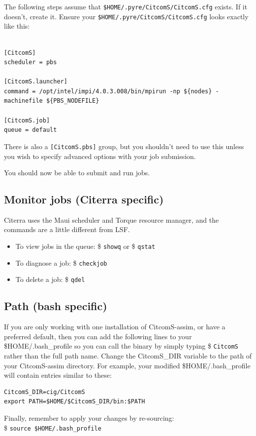 \documentclass[letterpaper,12pt]{article}
\newcommand{\tm}[1]{\$ \texttt{#1}}
\begin{document}
The following steps assume that \verb#$HOME/.pyre/CitcomS/CitcomS.cfg# exists.  If it doesn't, create it.
Ensure your \verb#$HOME/.pyre/CitcomS/CitcomS.cfg# looks exactly like this:

\begin{verbatim}

[CitcomS]
scheduler = pbs

[CitcomS.launcher]
command = /opt/intel/impi/4.0.3.008/bin/mpirun -np ${nodes} -machinefile ${PBS_NODEFILE}

[CitcomS.job]
queue = default
\end{verbatim}
There is also a \verb#[CitcomS.pbs]# group, but you shouldn't need to use this unless you wish to specify advanced options with your job submission.

You should now be able to submit and run jobs.
\subsection{Monitor jobs (Citerra specific)}
Citerra uses the Maui scheduler and Torque resource manager, and the commands are a little different from LSF.
\begin{itemize}
\item To view jobs in the queue: \tm{showq} or \tm{qstat}
\item To diagnose a job: \tm{checkjob}
\item To delete a job: \tm{qdel}
\end{itemize}
\subsection{Path (bash specific)}
If you are only working with one installation of CitcomS-assim, or have a preferred default, then you can add the following lines to your \$HOME/.bash\_profile so you can call the binary by simply typing \tm{CitcomS} rather than the full path name.  Change the CitcomS\_DIR variable to the path of your CitcomS-assim directory.  For example, your modified \$HOME/.bash\_profile will contain entries similar to these:
\begin{verbatim}
CitcomS_DIR=cig/CitcomS
export PATH=$HOME/$CitcomS_DIR/bin:$PATH
\end{verbatim}
Finally, remember to apply your changes by re-sourcing:\\
\tm{source \$HOME/.bash\_profile}
\end{document}
